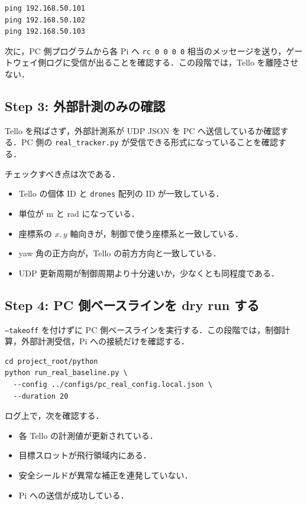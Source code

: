 \begin{lstlisting}
ping 192.168.50.101
ping 192.168.50.102
ping 192.168.50.103
\end{lstlisting}

次に，PC 側プログラムから各 Pi へ \texttt{rc 0 0 0 0} 相当のメッセージを送り，ゲートウェイ側ログに受信が出ることを確認する．この段階では，Tello を離陸させない．

\subsection{Step 3: 外部計測のみの確認}

Tello を飛ばさず，外部計測系が UDP JSON を PC へ送信しているか確認する．PC 側の \texttt{real\_tracker.py} が受信できる形式になっていることを確認する．

チェックすべき点は次である．

\begin{itemize}
  \item Tello の個体 ID と \texttt{drones} 配列の ID が一致している．
  \item 単位が m と rad になっている．
  \item 座標系の $x,y$ 軸向きが，制御で使う座標系と一致している．
  \item yaw 角の正方向が，Tello の前方方向と一致している．
  \item UDP 更新周期が制御周期より十分速いか，少なくとも同程度である．
\end{itemize}

\subsection{Step 4: PC 側ベースラインを dry run する}

\texttt{--takeoff} を付けずに PC 側ベースラインを実行する．この段階では，制御計算，外部計測受信，Pi への接続だけを確認する．

\begin{lstlisting}
cd project_root/python
python run_real_baseline.py \
  --config ../configs/pc_real_config.local.json \
  --duration 20
\end{lstlisting}

ログ上で，次を確認する．

\begin{itemize}
  \item 各 Tello の計測値が更新されている．
  \item 目標スロットが飛行領域内にある．
  \item 安全シールドが異常な補正を連発していない．
  \item Pi への送信が成功している．
\end{itemize}

